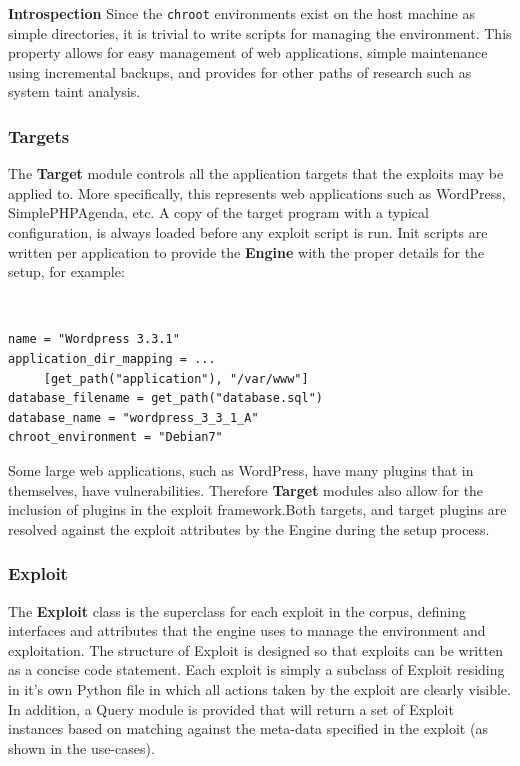 \documentclass[letterpaper,twocolumn,10pt]{article}
\begin{document}
{\bf Introspection} Since the {\tt chroot} environments exist on the host machine as simple directories, it is trivial to write scripts for managing the environment. This property allows for easy management of web applications, simple maintenance using incremental backups, and provides for other paths of research such as system taint analysis.



\subsubsection{Targets}
   The {\bf Target} module controls all the application targets that the exploits may be applied to.  More specifically, this represents web applications such as WordPress, SimplePHPAgenda, etc. A copy of the target program with a typical configuration, is always loaded before any exploit script is run.  Init scripts are written per application to provide the {\bf Engine} with the proper details for the setup, for example:

\begin{minipage}{\textwidth}
{\tt \footnotesize
\begin{lstlisting}
name = "Wordpress 3.3.1"
application_dir_mapping = ...
     [get_path("application"), "/var/www"]
database_filename = get_path("database.sql")
database_name = "wordpress_3_3_1_A"
chroot_environment = "Debian7"
\end{lstlisting}
} 
\end{minipage}


Some large web applications, such as WordPress, have many plugins that in themselves, have vulnerabilities. Therefore {\bf Target} modules also allow for the inclusion of plugins in the exploit framework.Both targets, and target plugins are resolved against the exploit attributes by the Engine during the setup process. 


\subsubsection{Exploit}
The {\bf Exploit} class is the superclass for each exploit in the corpus, defining interfaces and attributes that the engine uses to manage the environment and exploitation. The structure of Exploit is designed so that exploits can be written as a concise code statement. Each exploit is simply a subclass of Exploit residing in it's own Python file in which all actions taken by the exploit are clearly visible. In addition, a Query module is provided that will return a set of Exploit instances based on matching against the meta-data specified in the exploit (as shown in the use-cases).\par
\end{document}
